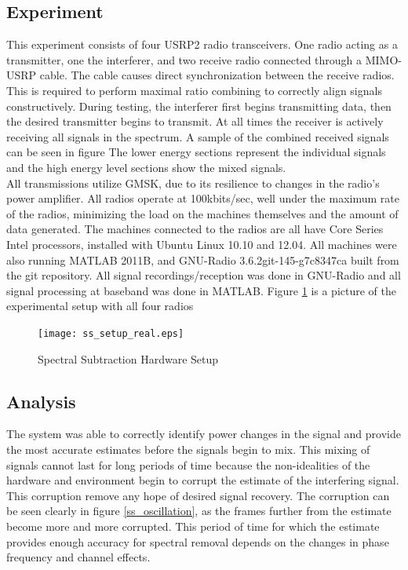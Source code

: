 \subsection{Experiment}

This experiment consists of four USRP2 radio transceivers.  One radio acting as a transmitter, one the interferer, and two receive radio connected through a MIMO-USRP cable.  The cable causes direct synchronization between the receive radios.  This is required to perform maximal ratio combining to correctly align signals constructively.  During testing, the interferer first begins transmitting data, then the desired transmitter begins to transmit.  At all times the receiver is actively receiving all signals in the spectrum.  A sample of the combined received signals can be seen in figure %
The lower energy sections represent the individual signals and the high energy level sections show the mixed signals.\\

All transmissions utilize GMSK, due to its resilience to changes in the radio's power amplifier.  All radios operate at 100kbits/sec, well under the maximum rate of the radios, minimizing the load on the machines themselves and the amount of data generated.  The machines connected to the radios are all have Core Series Intel processors, installed with Ubuntu Linux 10.10 and 12.04.  All machines were also running MATLAB 2011B, and GNU-Radio 3.6.2git-145-g7c8347ca built from the git repository.  All signal recordings/reception was done in GNU-Radio and all signal processing at baseband was done in MATLAB.  Figure \ref{ss_setup_real} is a picture of the experimental setup with all four radios

\begin{figure}\label{ss_setup_real}
\centering
\texttt{[image: ss\_setup\_real.eps]}
\caption{Spectral Subtraction Hardware Setup}
\end{figure}

\subsection{Analysis}

The system was able to correctly identify power changes in the signal and provide the most accurate estimates before the signals begin to mix.  This mixing of signals cannot last for long periods of time because the non-idealities of the hardware and environment begin to corrupt the estimate of the interfering signal.  This corruption remove any hope of desired signal recovery.  The corruption can be seen clearly in figure \ref{ss_oscillation}, as the frames further from the estimate become more and more corrupted.  This period of time for which the estimate provides enough accuracy for spectral removal depends on the changes in phase frequency and channel effects.\\

